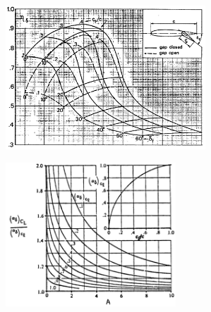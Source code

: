 %
%


\begin{figure}[H]
\centering
\begin{minipage}{.5\textwidth}
\centering
\includegraphics[height=5.4cm]{Immagini/Eta_Delta_Plain.png}
\label{efficiency}
\end{minipage}%
\begin{minipage}{.5\textwidth}
\centering
\includegraphics[height=5.4cm]{Immagini/alfadelta.png}
\label{eff2}
\end{minipage}
\label{fig:effects}
\end{figure}

